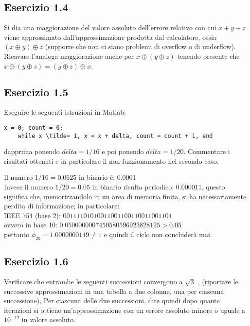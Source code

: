 \TODO


	\subsection{Esercizio 1.4}
	
Si dia una maggiorazione del valore assoluto dell’errore relativo con cui $x + y + z$ viene approssimato dall’approssimazione prodotta dal calcolatore, ossia $(x \oplus y) \oplus z$ (supporre che non ci siano problemi di overflow o di underflow). Ricavare l’analoga maggiorazione anche per $x \oplus (y \oplus z)$ tenendo presente che $x \oplus (y \oplus z) = (y \oplus z) \oplus x$.

\TODO


	\subsection{Esercizio 1.5}
Eseguire le seguenti istruzioni in Matlab:
\begin{lstlisting}[frame=single]
	x = 0; count = 0;	
	while x \tilde= 1, x = x + delta, count = count + 1, end
\end{lstlisting}
dapprima ponendo $delta = 1/16$ e poi ponendo $delta = 1/20$. Commentare i risultati ottenuti e in particolare il non funzionamento nel secondo caso.
\par
Il numero $1/16 = 0.0625$ in binario è: $0.0001$\\
Invece il numero $1/20 = 0.05$ in binario risulta periodico: $0.00\underline{0011}$, questo significa che, memorizzandolo in un area di memoria finita, si ha necessariamente perdita di informazione; in particolare:\\
IEEE 754 (base 2): $00111101010011001100110011001101$\\
ovvero in base 10: $0.0500000007450580596923828125 > 0.05$\\
pertanto $\phi_{20} = 1.0000000149 \neq 1$ e quindi il ciclo non concluderà mai.

	\subsection{Esercizio 1.6}
Verificare che entrambe le seguenti successioni convergono a $\sqrt{3}$ , (riportare le successive approssimazioni in una tabella a due colonne, una per ciascuna successione),
Per ciascuna delle due successioni, dire quindi dopo quante iterazioni si ottiene un’approssimazione con un errore assoluto minore o uguale a $10^{-12}$ in valore assoluto.

